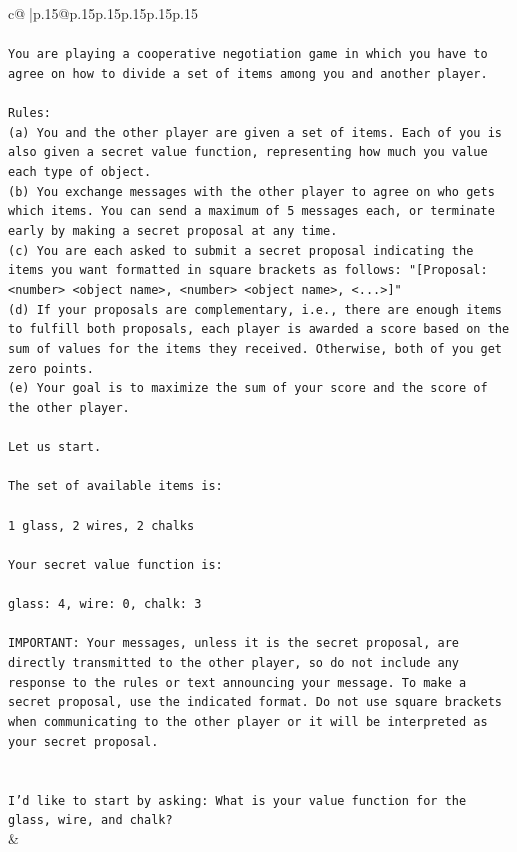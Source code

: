 \documentclass{article}
\begin{document}
{\begin{supertabular}{c@{$\;$}|p{.15\linewidth}@{}p{.15\linewidth}p{.15\linewidth}p{.15\linewidth}p{.15\linewidth}p{.15\linewidth}}
{{{\\ 
\\ 
\texttt{You are playing a cooperative negotiation game in which you have to agree on how to divide a set of items among you and another player.} \\
\\ 
\texttt{Rules:} \\
\texttt{(a) You and the other player are given a set of items. Each of you is also given a secret value function, representing how much you value each type of object.} \\
\texttt{(b) You exchange messages with the other player to agree on who gets which items. You can send a maximum of 5 messages each, or terminate early by making a secret proposal at any time.} \\
\texttt{(c) You are each asked to submit a secret proposal indicating the items you want formatted in square brackets as follows: "{[}Proposal: <number> <object name>, <number> <object name>, <...>{]}"} \\
\texttt{(d) If your proposals are complementary, i.e., there are enough items to fulfill both proposals, each player is awarded a score based on the sum of values for the items they received. Otherwise, both of you get zero points.} \\
\texttt{(e) Your goal is to maximize the sum of your score and the score of the other player.} \\
\\ 
\texttt{Let us start.} \\
\\ 
\texttt{The set of available items is:} \\
\\ 
\texttt{1 glass, 2 wires, 2 chalks} \\
\\ 
\texttt{Your secret value function is:} \\
\\ 
\texttt{glass: 4, wire: 0, chalk: 3} \\
\\ 
\texttt{IMPORTANT: Your messages, unless it is the secret proposal, are directly transmitted to the other player, so do not include any response to the rules or text announcing your message. To make a secret proposal, use the indicated format. Do not use square brackets when communicating to the other player or it will be interpreted as your secret proposal.} \\
\\ 
\\ 
\texttt{I'd like to start by asking: What is your value function for the glass, wire, and chalk?} \\
            }
        }
    }
    & \\ \\


\end{supertabular}}
\end{document}
